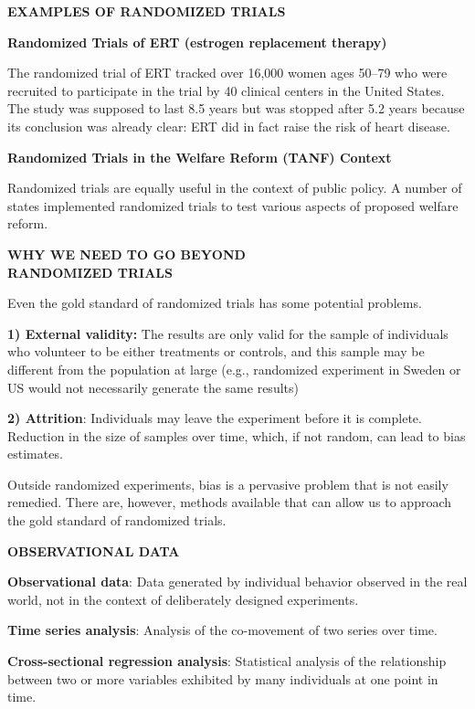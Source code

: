 \documentclass[landscape]{slides}
\begin{document}
\begin{slide}
\begin{center}
{\bf EXAMPLES OF RANDOMIZED TRIALS}
\end{center}

{\bf Randomized Trials of ERT (estrogen replacement therapy)}

The randomized trial of ERT tracked over 16,000 women ages 50--79 who were recruited to participate in the trial by 40 clinical centers in the United States. The study was supposed to last 8.5 years but was stopped after 5.2 years because its conclusion was already clear: ERT did in fact raise the risk of heart disease.

{\bf Randomized Trials in the Welfare Reform (TANF) Context}

Randomized trials are equally useful in the context of public policy. A number of states
implemented randomized trials to test various aspects of proposed welfare reform.
\end{slide}

\begin{slide}
\begin{center}
{\bf WHY WE NEED TO GO BEYOND \\ RANDOMIZED TRIALS}
\end{center}

Even the gold standard of randomized trials has some potential problems.

\textbf{1) External validity:} The results are only valid for the sample of individuals who volunteer to be either treatments or controls, and this sample may be different from the population at large
(e.g., randomized experiment in Sweden or US would not necessarily generate the same results)

{\bf 2) Attrition}: Individuals may leave the experiment before it is complete.
Reduction in the size of samples over time, which, if not random, can lead to bias estimates.

Outside randomized experiments, bias is a pervasive problem that is not easily remedied. There are, however, methods available that can allow us to approach the gold standard of randomized trials.
\end{slide}


\begin{slide}
\begin{center}
{\bf OBSERVATIONAL DATA}
\end{center}

{\bf Observational data}:
Data generated by individual behavior observed in the real world, not in the context of deliberately
designed experiments.

{\bf Time series analysis}:
Analysis of the co-movement of two series over time.

{\bf Cross-sectional regression analysis}:
Statistical analysis of the relationship between two or more variables exhibited by many individuals at one point in time.

\end{slide}
\end{document}
